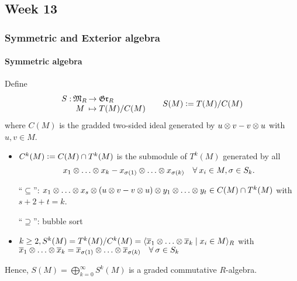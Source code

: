 \subsection{Week 13}
\subsubsection{Symmetric and Exterior algebra}
\paragraph{Symmetric algebra}
Define
\[
  \arraycolsep=1pt
  \begin{array}{rcl}
    S: & \Mf_R & \to \Grf_R \\
       & M & \mapsto \quot{T(M)}{C(M)}
  \end{array}
  \qquad S(M) \defeq \quot{T(M)}{C(M)}
\]
where $C(M)$ is the gradded two-sided ideal generated by
$u \otimes v - v\otimes u$ with $u, v \in M$.

\begin{itemize}
  \item $C^k(M) \vcentcolon= C(M) \cap T^k(M)$ is the submodule of $T^k(M)$ generated
    by all \[ x_1 \Ot \dots \Ot x_k - x_{\sigma(1)} \Ot \dots
    \Ot x_{\sigma(k)} \quad \forall x_i \in M, \sigma \in S_k. \]

    ``$\subseteq$'':
      $x_1 \Ot \dots \Ot x_s \Ot (u\Ot v - v\Ot u) \Ot y_1 \Ot \dots \Ot y_t
      \in C(M) \cap T^k(M)$ with $s + 2 + t = k$.

    ``$\supseteq$'': bubble sort
  \item $k \ge 2, S^k(M) = \quot{T^k(M)}{C^k(M)} =
    \gen{\ob{x}_1 \Ot \dots \Ot \ob{x}_k \mid x_i \in M}_R$ with
    $\ob{x}_1 \Ot \dots \Ot \ob{x}_k =
    \ob{x}_{\sigma(1)} \Ot \dots \Ot \ob{x}_{\sigma(k)} \quad
    \forall \sigma \in S_k$
\end{itemize}

Hence, $S(M) = \bigoplus_{k=0}^\infty S^k(M)$ is a graded commutative
$R$-algebra.

